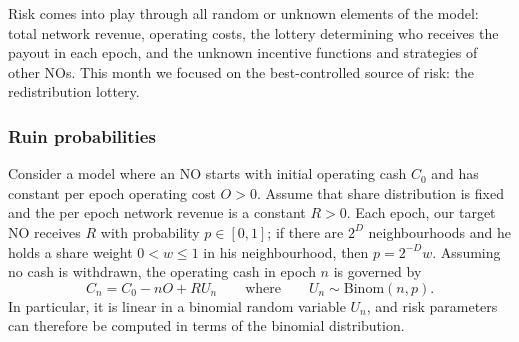 Risk comes into play through all random or unknown elements of the model: total network revenue, operating costs, the lottery determining who receives the payout in each epoch, and the unknown incentive functions and strategies of other NOs.
%
This month we focused on the best-controlled source of risk: the redistribution lottery.

\begin{comment}
\subsubsection*{Redistribution lottery structure}
 
A risk factor that is straightforwardly under the direct control of the system is the structure of the redistribution lottery.
%
Currently, in each epoch the full redistribution payout is awarded to a single NO with probability weighted by the number of bins and the NO share within the target bin.
%
Clearly, such an approach has higher variance than the expectation-equivalent deterministic system, which doles out a share of the payout weighted by the number of bins and bin share with probability $1$.

The random approach saves on computational costs by reducing the number of transfers that must be made in each epoch.
%
On the other hand, it introduces a risk of drawdowns and bankruptcy that especially affects smaller scale NOs, who may experience long strings of epochs without receiving any payout.
\end{comment}

\subsubsection*{Ruin probabilities}

Consider a model where an NO starts with initial operating cash $C_0$ and has constant per epoch operating cost $O>0$.
%
Assume that share distribution is fixed and the per epoch network revenue is a constant $R>0$.
%
Each epoch, our target NO receives $R$ with probability $p\in[0,1]$; if there are $2^D$ neighbourhoods and he holds a share weight $0<w\leq 1$ in his neighbourhood, then $p=2^{-D}w$.
%
Assuming no cash is withdrawn, the operating cash in epoch $n$ is governed by
\[
  C_n = C_0 - nO + RU_n \qquad\text{where}\qquad U_n\sim \mathrm{Binom}(n,p).
\]
In particular, it is linear in a binomial random variable $U_n$, and risk parameters can therefore be computed in terms of the binomial distribution.

